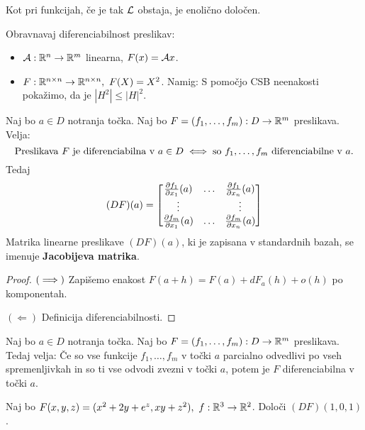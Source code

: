 \begin{opomba}
    Kot pri funkcijah, če je tak $\mathcal{L}$ obstaja, je enolično določen.
\end{opomba}

\begin{zgled}
    Obravnavaj diferenciabilnost preslikav:
    \begin{itemize}
        \item $\mathcal{A}: \mathbb{R}^n \to \mathbb{R}^m$ linearna, $F(x) = \mathcal{A}x$.
        \item $F: \mathbb{R}^{n \times n} \to \mathbb{R}^{n \times n}, \ F(X) = X^2$.         
        Namig: S pomočjo CSB neenakosti pokažimo, da je $|H^2| \leq |H|^2$.
    \end{itemize}
\end{zgled}

\begin{izrek}
    Naj bo $a \in D$ notranja točka. Naj bo $F = (f_1, \ldots, f_m): D \to \mathbb{R}^m$ preslikava. Velja: 
    $$\text{Preslikava } F \text{ je diferenciabilna v } a \in D \iff \text{so } f_1, \ldots, f_m \text{ diferenciabilne v } a.$$
    Tedaj
    $$(DF)(a) = \begin{bmatrix}
        \frac{\partial f_1}{\partial x_1}(a) & \ldots & \frac{\partial f_1}{\partial x_n}(a) \\
        \vdots & & \vdots \\
        \frac{\partial f_m}{\partial x_1}(a) & \ldots & \frac{\partial f_m}{\partial x_n}(a) 
    \end{bmatrix}$$
    Matrika linearne preslikave $(DF)(a)$, ki je zapisana v standardnih bazah, se imenuje \textbf{Jacobijeva matrika}.
\end{izrek}

\begin{proof}
    $(\implies)$ Zapišemo enakost $F(a+h) = F(a) + dF_a(h) + o(h)$ po komponentah.

    $(\Leftarrow)$ Definicija diferenciabilnosti.
\end{proof}

\begin{posledica}
    Naj bo $a \in D$ notranja točka. Naj bo $F = (f_1, \ldots, f_m): D \to \mathbb{R}^m$ preslikava. Tedaj velja:    
    Če so vse funkcije $f_1, \ldots, f_m$ v točki $a$ parcialno odvedlivi po vseh spremenljivkah in so ti vse odvodi zvezni v točki $a$, potem je $F$ diferenciabilna v točki $a$.
\end{posledica}

\begin{zgled}
    Naj bo $F(x,y,z) = (x^2+2y+e^z, xy+z^2), \ f: \R^3 \to \R^2$. Določi $(DF)(1,0,1)$.
\end{zgled}

